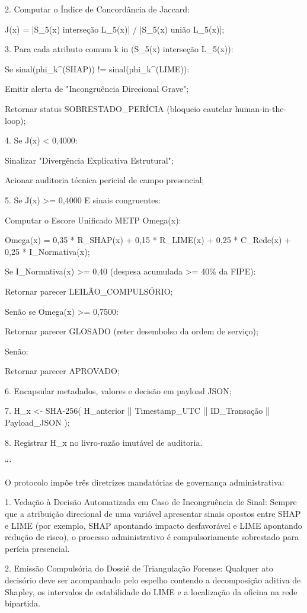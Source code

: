 \documentclass[12pt,a4paper]{article}
\begin{document}
2. Computar o Índice de Concordância de Jaccard:

J(x) = |S\_5(x) interseção L\_5(x)| / |S\_5(x) união L\_5(x)|;

3. Para cada atributo comum k in (S\_5(x) interseção L\_5(x)):

Se sinal(phi\_k^(SHAP)) != sinal(phi\_k^(LIME)):

Emitir alerta de "Incongruência Direcional Grave";

Retornar status SOBRESTADO\_PERÍCIA (bloqueio cautelar human-in-the-loop);

4. Se J(x) < 0,4000:

Sinalizar "Divergência Explicativa Estrutural";

Acionar auditoria técnica pericial de campo presencial;

5. Se J(x) >= 0,4000 E sinais congruentes:

Computar o Escore Unificado METP Omega(x):

Omega(x) = 0,35 * R\_SHAP(x) + 0,15 * R\_LIME(x) + 0,25 * C\_Rede(x) + 0,25 * I\_Normativa(x);

Se I\_Normativa(x) >= 0,40 (despesa acumulada >= 40\% da FIPE):

Retornar parecer LEILÃO\_COMPULSÓRIO;

Senão se Omega(x) >= 0,7500:

Retornar parecer GLOSADO (reter desembolso da ordem de serviço);

Senão:

Retornar parecer APROVADO;

6. Encapsular metadados, valores e decisão em payload JSON;

7. H\_x <- SHA-256( H\_anterior || Timestamp\_UTC || ID\_Transação || Payload\_JSON );

8. Registrar H\_x no livro-razão imutável de auditoria.

```

O protocolo impõe três diretrizes mandatórias de governança administrativa:

1. Vedação à Decisão Automatizada em Caso de Incongruência de Sinal: Sempre que a atribuição direcional de uma variável apresentar sinais opostos entre SHAP e LIME (por exemplo, SHAP apontando impacto desfavorável e LIME apontando redução de risco), o processo administrativo é compulsoriamente sobrestado para perícia presencial.

2. Emissão Compulsória do Dossiê de Triangulação Forense: Qualquer ato decisório deve ser acompanhado pelo espelho contendo a decomposição aditiva de Shapley, os intervalos de estabilidade do LIME e a localização da oficina na rede bipartida.
\end{document}
